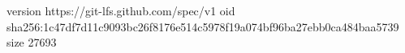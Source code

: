 version https://git-lfs.github.com/spec/v1
oid sha256:1c47df7d11c9093bc26f8176e514c5978f19a074bf96ba27ebb0ca484baa5739
size 27693

